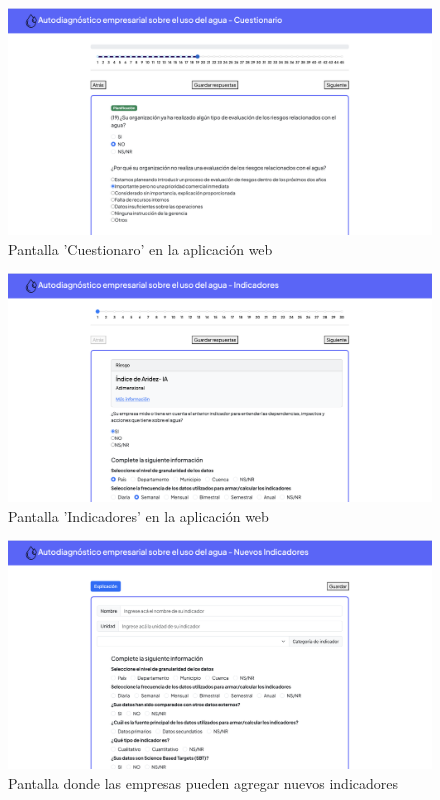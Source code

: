 \begin{figure}[H]
        \centering
        \includegraphics[scale=0.25]{images/99-aplicacion-web/3-cuestionario.png}
        \caption{Pantalla 'Cuestionaro' en la aplicación web}
\end{figure}

\begin{figure}[H]
        \centering
        \includegraphics[scale=0.25]{images/99-aplicacion-web/4-indicadores.png}
        \caption{Pantalla 'Indicadores' en la aplicación web}
\end{figure}

\begin{figure}[H]
        \centering
        \includegraphics[scale=0.25]{images/99-aplicacion-web/5-nuevos-indicadores.png}
        \caption{Pantalla donde las empresas pueden agregar nuevos indicadores}
\end{figure}

